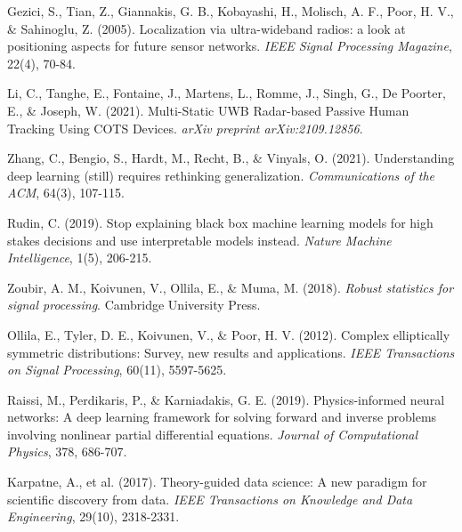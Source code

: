 \documentclass[12pt,a4paper]{article}
\begin{document}
	\begin{thebibliography}{99}
		
		Gezici, S., Tian, Z., Giannakis, G. B., Kobayashi, H., Molisch, A. F., Poor, H. V., \& Sahinoglu, Z. (2005). Localization via ultra-wideband radios: a look at positioning aspects for future sensor networks. \textit{IEEE Signal Processing Magazine}, 22(4), 70-84.
		
		Li, C., Tanghe, E., Fontaine, J., Martens, L., Romme, J., Singh, G., De Poorter, E., \& Joseph, W. (2021). Multi-Static UWB Radar-based Passive Human Tracking Using COTS Devices. \textit{arXiv preprint arXiv:2109.12856}.
		
		Zhang, C., Bengio, S., Hardt, M., Recht, B., \& Vinyals, O. (2021). Understanding deep learning (still) requires rethinking generalization. \textit{Communications of the ACM}, 64(3), 107-115.
		
		Rudin, C. (2019). Stop explaining black box machine learning models for high stakes decisions and use interpretable models instead. \textit{Nature Machine Intelligence}, 1(5), 206-215.
		
		Zoubir, A. M., Koivunen, V., Ollila, E., \& Muma, M. (2018). \textit{Robust statistics for signal processing}. Cambridge University Press.
		
		Ollila, E., Tyler, D. E., Koivunen, V., \& Poor, H. V. (2012). Complex elliptically symmetric distributions: Survey, new results and applications. \textit{IEEE Transactions on Signal Processing}, 60(11), 5597-5625.
		
		Raissi, M., Perdikaris, P., \& Karniadakis, G. E. (2019). Physics-informed neural networks: A deep learning framework for solving forward and inverse problems involving nonlinear partial differential equations. \textit{Journal of Computational Physics}, 378, 686-707.
		
		Karpatne, A., et al. (2017). Theory-guided data science: A new paradigm for scientific discovery from data. \textit{IEEE Transactions on Knowledge and Data Engineering}, 29(10), 2318-2331.
		

\end{thebibliography}
\end{document}
